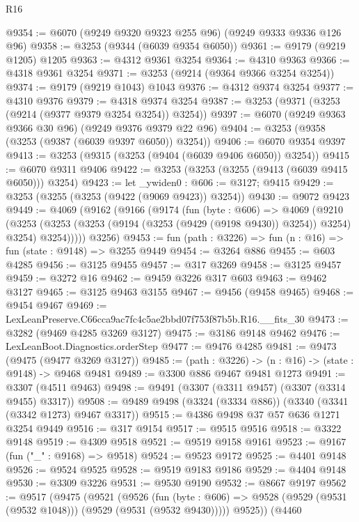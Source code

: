 \begin{lexlean}{R16}
\begin{coremodule}
@9354 := @6070 (@9249 @9320 @9323 @255 @96) (@9249 @9333 @9336 @126 @96)
@9358 := @3253 (@9344 (@6039 @9354 @6050))
@9361 := @9179 (@9219 @1205) @1205
@9363 := @4312 @9361 @3254
@9364 := @4310 @9363
@9366 := @4318 @9361 @3254
@9371 := @3253 (@9214 (@9364 @9366 @3254 @3254))
@9374 := @9179 (@9219 @1043) @1043
@9376 := @4312 @9374 @3254
@9377 := @4310 @9376
@9379 := @4318 @9374 @3254
@9387 := @3253 (@9371 (@3253 (@9214 (@9377 @9379 @3254 @3254)) @3254))
@9397 := @6070 (@9249 @9363 @9366 @30 @96) (@9249 @9376 @9379 @22 @96)
@9404 := @3253 (@9358 (@3253 (@9387 (@6039 @9397 @6050)) @3254))
@9406 := @6070 @9354 @9397
@9413 := @3253 (@9315 (@3253 (@9404 (@6039 @9406 @6050)) @3254))
@9415 := @6070 @9311 @9406
@9422 := @3253 (@3253 (@3255 (@9413 (@6039 @9415 @6050))) @3254)
@9423 := let _ywiden0 : @606 := @3127; @9415
@9429 := @3253 (@3255 (@3253 (@9422 (@9069 @9423)) @3254))
@9430 := @9072 @9423
@9449 := @4069
    (@9162
      (@9166
        (@9174
          (fun (byte : @606) =>
          @4069
            (@9210
              (@3253
                (@3253 (@3253 (@9194 (@3253 (@9429 (@9198 @9430)) @3254)) @3254) @3254)
                @3254)))))
      @3256)
@9453 := fun (path : @3226) => fun (n : @16) => fun (state : @9148) => @3255 @9449
@9454 := @3264 @886
@9455 := @603 @4285
@9456 := @3125 @9455
@9457 := @317 @3269
@9458 := @3125 @9457
@9459 := @3272 @16
@9462 := @9459 @3226 @317 @603
@9463 := @9462 @3127
@9465 := @3125 @9463 @3155
@9467 := @9456 (@9458 @9465)
@9468 := @9454 @9467
@9469 := LexLeanPreserve.C66cca9ac7fc4c5ae2bbd07f753f87b5b.R16.__fits_30
@9473 := @3282 (@9469 @4285 @3269 @3127)
@9475 := @3186 @9148 @9462
@9476 := LexLeanBoot.Diagnostics.orderStep
@9477 := @9476 @4285
@9481 := @9473 (@9475 (@9477 @3269 @3127))
@9485 := (path : @3226) -> (n : @16) -> (state : @9148) -> @9468 @9481
@9489 := @3300 @886 @9467 @9481 @1273
@9491 := @3307 (@4511 @9463)
@9498 := @9491 (@3307 (@3311 @9457) (@3307 (@3314 @9455) @3317))
@9508 := @9489 @9498 (@3324 (@3334 @886)) (@3340 (@3341 (@3342 @1273) @9467 @3317))
@9515 := @4386 @9498 @37 @57 @636 @1271 @3254 @9449
@9516 := @317 @9154
@9517 := @9515 @9516
@9518 := @3322 @9148
@9519 := @4309 @9518
@9521 := @9519 @9158 @9161
@9523 := @9167 (fun ("_" : @9168) => @9518)
@9524 := @9523 @9172
@9525 := @4401 @9148
@9526 := @9524 @9525
@9528 := @9519 @9183 @9186
@9529 := @4404 @9148
@9530 := @3309 @3226
@9531 := @9530 @9190
@9532 := @8667 @9197
@9562 := @9517
    (@9475
      (@9521
        (@9526
          (fun (byte : @606) => @9528 (@9529 (@9531 (@9532 @1048))) (@9529 (@9531 (@9532 @9430)))))
        @9525))
    (@4460

\end{coremodule}
\end{lexlean}
